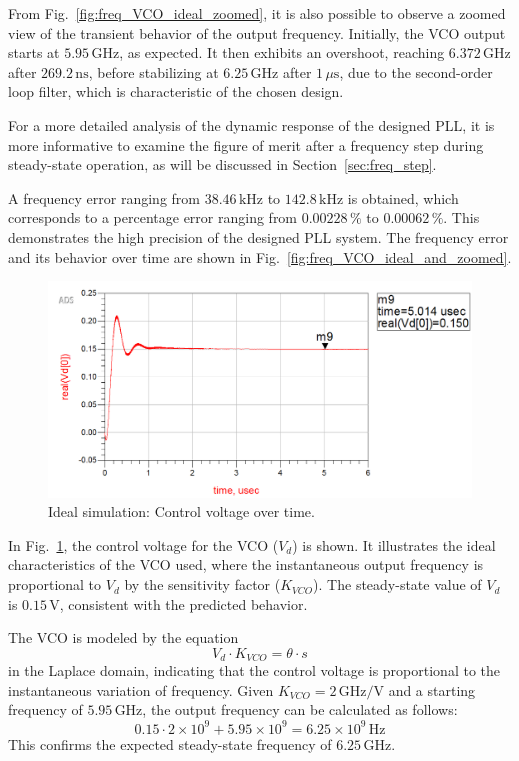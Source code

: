 \documentclass[lettersize,journal]{IEEEtran}
\begin{document}
From Fig.~\ref{fig:freq_VCO_ideal_zoomed}, it is also possible to observe a zoomed view of the transient behavior of the output frequency. Initially, the VCO output starts at \(5.95 \, \text{GHz}\), as expected. It then exhibits an overshoot, reaching \(6.372 \, \text{GHz}\) after \(269.2 \, \text{ns}\), before stabilizing at \(6.25 \, \text{GHz}\) after \(1 \, \mu\text{s}\), due to the second-order loop filter, which is characteristic of the chosen design.

For a more detailed analysis of the dynamic response of the designed PLL, it is more informative to examine the figure of merit after a frequency step during steady-state operation, as will be discussed in Section~\ref{sec:freq_step}.  

A frequency error ranging from \(38.46 \, \text{kHz}\) to \(142.8 \, \text{kHz}\) is obtained, which corresponds to a percentage error ranging from \(0.00228 \, \%\) to \(0.00062 \, \%\). This demonstrates the high precision of the designed PLL system. The frequency error and its behavior over time are shown in Fig.~\ref{fig:freq_VCO_ideal_and_zoomed}.

\begin{figure}[!ht]
    \centering
    \includegraphics[width=1\linewidth]{images/ads_results/ideal_pll/Vd_ideal.png}
    \caption{Ideal simulation: Control voltage over time.}
    \label{fig:Vd_ideal}
\end{figure}

In Fig.~\ref{fig:Vd_ideal}, the control voltage for the VCO (\(V_d\)) is shown. It illustrates the ideal characteristics of the VCO used, where the instantaneous output frequency is proportional to \(V_d\) by the sensitivity factor (\(K_{VCO}\)). The steady-state value of \(V_d\) is \(0.15 \, \text{V}\), consistent with the predicted behavior. 

The VCO is modeled by the equation 
\[
V_d \cdot K_{VCO} = \theta \cdot s
\] 
in the Laplace domain, indicating that the control voltage is proportional to the instantaneous variation of frequency. Given \(K_{VCO} = 2 \, \text{GHz/V}\) and a starting frequency of \(5.95 \, \text{GHz}\), the output frequency can be calculated as follows:
\[
0.15 \cdot 2 \times 10^9 + 5.95 \times 10^9 = 6.25 \times 10^9 \, \text{Hz}
\]
This confirms the expected steady-state frequency of \(6.25 \, \text{GHz}\).
\end{document}
